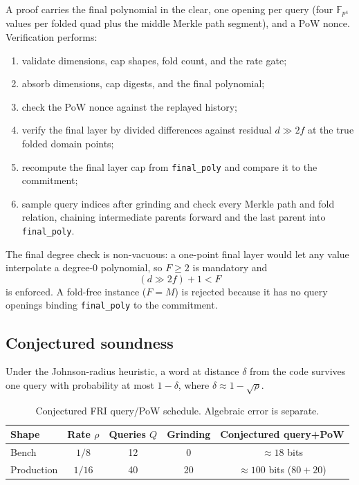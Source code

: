 \documentclass[11pt,a4paper]{article}
\newcommand{\yFpFour}{\mathbb{F}_{p^4}}
\begin{document}
A proof carries the final polynomial in the clear, one opening per query
(four $\yFpFour$ values per folded quad plus the middle Merkle path segment),
and a PoW nonce. Verification performs:
\begin{enumerate}[leftmargin=1.3em]
\item validate dimensions, cap shapes, fold count, and the rate gate;
\item absorb dimensions, cap digests, and the final polynomial;
\item check the PoW nonce against the replayed history;
\item verify the final layer by divided differences against residual
$d\gg2f$ at the true folded domain points;
\item recompute the final layer cap from \texttt{final\_poly} and compare it
to the commitment;
\item sample query indices after grinding and check every Merkle path and fold
relation, chaining intermediate parents forward and the last parent into
\texttt{final\_poly}.
\end{enumerate}

The final degree check is non-vacuous: a one-point final layer would let any
value interpolate a degree-0 polynomial, so $F\ge2$ is mandatory and
\[
(d\gg2f)+1<F
\]
is enforced. A fold-free instance ($F=M$) is rejected because it has no query
openings binding \texttt{final\_poly} to the commitment.

\subsection{Conjectured soundness}

Under the Johnson-radius heuristic, a word at distance $\delta$ from the code
survives one query with probability at most $1-\delta$, where
$\delta\approx1-\sqrt{\rho}$.

\begin{table}[h]
\centering
\small
\begin{tabular}{@{}lcccc@{}}
\toprule
Shape & Rate $\rho$ & Queries $Q$ & Grinding & Conjectured query+PoW \\
\midrule
Bench & $1/8$ & 12 & 0 & $\approx18$ bits \\
Production & $1/16$ & 40 & 20 & $\approx100$ bits ($80+20$) \\
\bottomrule
\end{tabular}
\caption{Conjectured FRI query/PoW schedule. Algebraic error is separate.}
\end{table}
\end{document}
